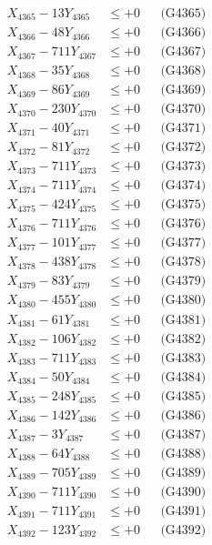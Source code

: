 \documentclass[a4paper,10pt]{article}
\begin{document}
{\begin{align}
X_{4365} - 13Y_{4365} &\leq +0 && \text{(G4365)} \\
X_{4366} - 48Y_{4366} &\leq +0 && \text{(G4366)} \\
X_{4367} - 711Y_{4367} &\leq +0 && \text{(G4367)} \\
X_{4368} - 35Y_{4368} &\leq +0 && \text{(G4368)} \\
X_{4369} - 86Y_{4369} &\leq +0 && \text{(G4369)} \\
X_{4370} - 230Y_{4370} &\leq +0 && \text{(G4370)} \\
\allowbreak
X_{4371} - 40Y_{4371} &\leq +0 && \text{(G4371)} \\
X_{4372} - 81Y_{4372} &\leq +0 && \text{(G4372)} \\
X_{4373} - 711Y_{4373} &\leq +0 && \text{(G4373)} \\
X_{4374} - 711Y_{4374} &\leq +0 && \text{(G4374)} \\
X_{4375} - 424Y_{4375} &\leq +0 && \text{(G4375)} \\
X_{4376} - 711Y_{4376} &\leq +0 && \text{(G4376)} \\
X_{4377} - 101Y_{4377} &\leq +0 && \text{(G4377)} \\
X_{4378} - 438Y_{4378} &\leq +0 && \text{(G4378)} \\
X_{4379} - 83Y_{4379} &\leq +0 && \text{(G4379)} \\
X_{4380} - 455Y_{4380} &\leq +0 && \text{(G4380)} \\
\allowbreak
X_{4381} - 61Y_{4381} &\leq +0 && \text{(G4381)} \\
X_{4382} - 106Y_{4382} &\leq +0 && \text{(G4382)} \\
X_{4383} - 711Y_{4383} &\leq +0 && \text{(G4383)} \\
X_{4384} - 50Y_{4384} &\leq +0 && \text{(G4384)} \\
X_{4385} - 248Y_{4385} &\leq +0 && \text{(G4385)} \\
X_{4386} - 142Y_{4386} &\leq +0 && \text{(G4386)} \\
X_{4387} - 3Y_{4387} &\leq +0 && \text{(G4387)} \\
X_{4388} - 64Y_{4388} &\leq +0 && \text{(G4388)} \\
X_{4389} - 705Y_{4389} &\leq +0 && \text{(G4389)} \\
X_{4390} - 711Y_{4390} &\leq +0 && \text{(G4390)} \\
\allowbreak
X_{4391} - 711Y_{4391} &\leq +0 && \text{(G4391)} \\
X_{4392} - 123Y_{4392} &\leq +0 && \text{(G4392)} \\

\end{align}}
\end{document}
